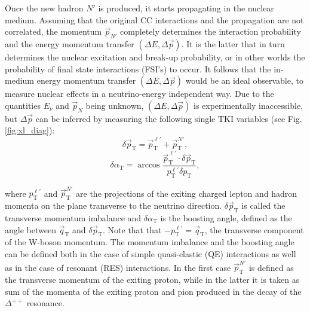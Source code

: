 Once the new hadron $N'$ is produced, it starts propagating in the nuclear medium. Assuming that the original CC interactions and the propagation are not correlated, the momentum  $\Vec{p}_{N'}$ completely determines the interaction probability and the energy momentum transfer $(\Delta E,\Delta \Vec{p})$. It is the latter that in turn determines the nuclear excitation and break-up probability, or in other worlds the probability of final state interactions (FSI's) to occur. It follows that the in-medium energy momentum transfer $(\Delta E,\Delta \Vec{p})$ would be an ideal observable, to measure nuclear effects in a neutrino-energy independent way. Due to the quantities $E_\nu$ and $\Vec{p}_{N}$ being unknown, $(\Delta E,\Delta \Vec{p})$ is experimentally inaccessible, but $\Delta \Vec{p}$ can be inferred by measuring the following single TKI variables (see Fig. \ref{fig:xl_diag}):
\begin{equation}
    \delta \Vec{p}_\text{T} = \Vec{p}_\text{T}^{\ell'}+\Vec{p}_\text{T}^{N'},
\end{equation}
\begin{equation}
    \delta \alpha_\text{T} = \arccos \frac{\Vec{p}_\text{T}^{\ell'} \cdot \delta \Vec{p}_\text{T}}{p_\text{T}^{\ell'}  \delta p_\text{T}},
\end{equation}

where $p_\text{T}^{\ell'}$ and $\Vec{p}_\text{T}^{N'}$ are the projections of the exiting charged lepton and hadron momenta on the plane transverse to the neutrino direction. $\delta \Vec{p}_\text{T}$ is called the transverse momentum imbalance and $\delta \alpha_\text{T}$ is the boosting angle, defined as the angle between $\Vec{q}_\text{T}$ and $\delta \Vec{p}_\text{T}$. Note that that $-p_\text{T}^{\ell'} = \Vec{q}_\text{T}$, the transverse component of the W-boson momentum.  The momentum imbalance and the boosting angle can be defined both in the case of simple quasi-elastic (QE) interactions as well as in the case of resonant (RES) interactions. In the first case $\Vec{p}_\text{T}^{N'}$ is defined as the transverse momentum of the exiting proton, while in the latter it is taken as sum of the momenta of the exiting proton and pion produced in the decay of the $\Delta^{++}$ resonance.

